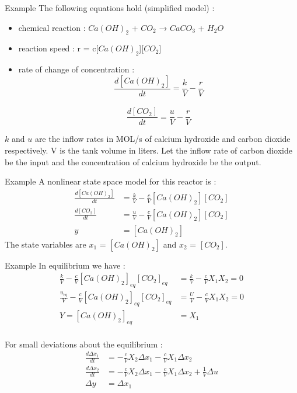 \begin{frame}{Example}
The following equations hold (simplified model) :
\begin{itemize}
    \item chemical reaction : $Ca(OH)_2$ + $CO_2$ → $CaCO_3$ + $H_2O$
    \item reaction speed : r = c[$Ca(OH)_2$][$CO_2$]

    \item rate of change of concentration : $$\frac{d[Ca(OH)_2]}{dt} = \frac{k}{V} - \frac{r}{V}$$\\
    $$\frac{d[CO_2]}{dt} = \frac{u}{V} - \frac{r}{V}$$

\end{itemize}
$k$ and $u$ are the inflow rates in MOL/s of calcium
hydroxide and carbon dioxide respectively.
V is the tank volume in liters.
Let the inflow rate of carbon dioxide be the input and the
concentration of calcium hydroxide be the output.

\end{frame}

\begin{frame}{Example}
A nonlinear state space model for this reactor is :
\begin{align*}
\frac{d[Ca(OH)_2]}{dt}&=\frac{k}{V} - \frac{c}{V}[Ca(OH)_2][CO_2]\\
\frac{d[CO_2]}{dt} &= \frac{u}{V} - \frac{c}{V}[Ca(OH)_2][CO_2]\\
y&=[Ca(OH)_2]
\end{align*}
The state variables are $x_1$ = $[Ca(OH)_2
]$ and $x_2$ = $[CO_2]$.

\end{frame}

\begin{frame}{Example}
In equilibrium we have :
\begin{align*}
\frac{k}{V} - \frac{c}{V}[Ca(OH)_2]_{eq}[CO_2]_{eq} &= \frac{k}{V} - \frac{c}{V}X_1X_2=0\\
\frac{u_{eq}}{V} - \frac{c}{V}[Ca(OH)_2]_{eq}[CO_2]_{eq} &= \frac{U}{V} - \frac{c}{V}X_1X_2=0\\
Y=[Ca(OH)_2]_{eq}&=X_1\\
\end{align*}

For small deviations about the equilibrium :
\begin{align*}
\frac{d\Delta x_1}{dt} &=- \frac{c}{V}X_2\Delta x_1- \frac{c}{V}X_1\Delta x_2\\
\frac{d\Delta x_2}{dt} &=- \frac{c}{V}X_2\Delta x_1- \frac{c}{V}X_1\Delta x_2+\frac{1}{V}\Delta u\\
\Delta y &= \Delta x_1
\end{align*}

\end{frame}

